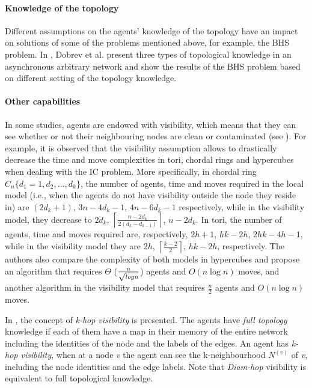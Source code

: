 \paragraph{Knowledge of the topology} 
Different assumptions on the agents' knowledge of the topology have an impact on solutions of some of the problems mentioned above, for example, the BHS problem. In \cite{dobr}, Dobrev et al. present three types of topological knowledge in an asynchronous arbitrary network and show the results of the BHS problem based on different setting of the topology knowledge.

\paragraph{Other capabilities}
In some studies, agents are endowed with   visibility, which means that they can see whether or not their neighbouring nodes are clean or contaminated (see \cite{mhuang, mhuang1}). For example, it  is observed that the visibility assumption allows   to drastically decrease the time and move complexities in tori, chordal rings and hypercubes when dealing with the  IC problem. More specifically, in chordal ring $C_n\{d_1=1,d_2,...,d_k\}$, the number of agents,   time and   moves required in the  local model (i.e., when the agents do not have visibility outside the node they reside  in)  are $(2d_k+1)$, $3n-4d_k-1$, $4n-6d_k-1$ respectively, while in the visibility model, they decrease to $2d_k$, $\left \lceil \frac{n-2d_{k}}{2(d_{k}-d_{k-1})} \right \rceil$, $n-2d_k$. In tori, the number of agents,   time and   moves required are, respectively,  $2h+1$, $hk-2h$, $2hk-4h-1$, while  in the  visibility model they are $2h$, $\left \lceil \frac{k-2}{2} \right \rceil$, $hk-2h$, respectively. The authors also compare the complexity of both models in hypercubes  and propose an algorithm that requires $\Theta$  ($n \over { \sqrt {log n}} $) agents and $O(n \log n)$ moves, and another algorithm   in the visibility model that requires $\frac{n}{2}$ agents and $O(n \log n)$ moves.

In \cite{cai}, the concept of {\em k-hop visibility} is presented. The agents have   {\em full topology} knowledge if each of them have a map in their memory  of the entire network including the identities of the node and the labels of the edges. An agent has {\em k-hop visibility}, when at a node {\em v} the agent can see the k-neighbourhood $N^{(v)}$ of {\em v}, including the node identities and the edge labels. Note that {\em Diam-hop} visibility is equivalent to full topological knowledge. 

